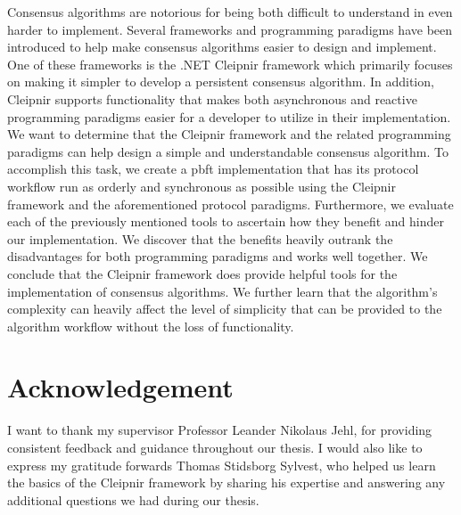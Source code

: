 \documentclass[12pt, a4paper]{report}
\numberwithin{figure}{section}
\numberwithin{table}{section}
\begin{document}
	\abstract
	{
Consensus algorithms are notorious for being both difficult to understand in even harder to implement. Several frameworks and programming paradigms have been introduced to help make consensus algorithms easier to design and implement. One of these frameworks is the .NET Cleipnir framework which primarily focuses on making it simpler to develop a persistent consensus algorithm. In addition, Cleipnir supports functionality that makes both asynchronous and reactive programming paradigms easier for a developer to utilize in their implementation. We want to determine that the Cleipnir framework and the related programming paradigms can help design a simple and understandable consensus algorithm. To accomplish this task, we create a \acl{pbft} implementation that has its protocol workflow run as orderly and synchronous as possible using the Cleipnir framework and the aforementioned protocol paradigms.
Furthermore, we evaluate each of the previously mentioned tools to ascertain how they benefit and hinder our implementation. We discover that the benefits heavily outrank the disadvantages for both programming paradigms and works well together. We conclude that the Cleipnir framework does provide helpful tools for the implementation of consensus algorithms.  We further learn that the algorithm’s complexity can heavily affect the level of simplicity that can be provided to the algorithm workflow without the loss of functionality. 
	}
	\newpage
	\section*{Acknowledgement}
I want to thank my supervisor Professor Leander Nikolaus Jehl, for providing consistent feedback and guidance throughout our thesis. I would also like to express my gratitude forwards Thomas Stidsborg Sylvest, who helped us learn the basics of the Cleipnir framework by sharing his expertise and answering any additional questions we had during our thesis.	
	
	\newpage		
	
	\printacronyms
	
	\setlength{\parindent}{0em} 
	
	
\end{document}
